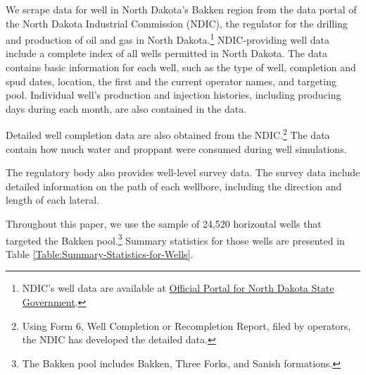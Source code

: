 
We scrape data for well in North Dakota's Bakken region from the data portal of the North Dakota Industrial Commission (NDIC), the regulator for the drilling and production of oil and gas in North Dakota.\footnote{NDIC's well data are available at \href{https://www.dmr.nd.gov/oilgas}{Official Portal for North Dakota State Government}.} NDIC-providing well data include a complete index of all wells permitted in North Dakota. The data contains basic information for each well, such as the type of well, completion and spud dates, location, the first and the current operator names, and targeting pool. Individual well's production and injection histories, including producing days during each month, are also contained in the data. 

Detailed well completion data are also obtained from the NDIC.\footnote{Using Form 6, Well Completion or Recompletion Report, filed by operators, the NDIC has developed the detailed data.} The data contain how much water and proppant were consumed during well simulations.

The regulatory body also provides well-level survey data. The survey data include detailed information on the path of each wellbore, including the direction and length of each lateral. 

Throughout this paper, we use the sample of 24,520 horizontal wells that targeted the Bakken pool.\footnote{The Bakken pool includes Bakken, Three Forks, and Sanish formations.} Summary statistics for those wells are presented in Table \ref{Table:Summary-Statistics-for-Wells}.
